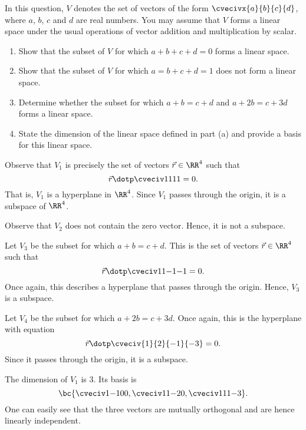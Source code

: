 \begin{problem}
    In this question, $V$ denotes the set of vectors of the form $\cvecivx{a}{b}{c}{d}$, where $a$, $b$, $c$ and $d$ are real numbers. You may assume that $V$ forms a linear space under the usual operations of vector addition and multiplication by scalar.

    \begin{enumerate}
        \item Show that the subset of $V$ for which $a + b + c + d = 0$ forms a linear space.
        \item Show that the subset of $V$ for which $a = b + c + d = 1$ does not form a linear space.
        \item Determine whether the subset for which $a + b = c + d$ and $a + 2b = c + 3d$ forms a linear space.
        \item State the dimension of the linear space defined in part (a) and provide a basis for this linear space.
    \end{enumerate}
\end{problem}
\begin{solution}
    \begin{ppart}
        Observe that $V_1$ is precisely the set of vectors $\vec r \in \RR^4$ such that \[\vec r \dotp \cveciv1111 = 0.\] That is, $V_1$ is a hyperplane in $\RR^4$. Since $V_1$ passes through the origin, it is a subspace of $\RR^4$.
    \end{ppart}
    \begin{ppart}
        Observe that $V_2$ does not contain the zero vector. Hence, it is not a subspace.
    \end{ppart}
    \begin{ppart}
        Let $V_3$ be the subset for which $a + b = c + d$. This is the set of vectors $\vec r \in \RR^4$ such that \[\vec r \dotp \cveciv11{-1}{-1} = 0.\] Once again, this describes a hyperplane that passes through the origin. Hence, $V_3$ is a subspace.

        Let $V_4$ be the subset for which $a + 2b = c + 3d$. Once again, this is the hyperplane with equation \[\vec r \dotp \cveciv{1}{2}{-1}{-3} = 0.\] Since it passes through the origin, it is a subspace.
    \end{ppart}
    \begin{ppart}
        The dimension of $V_1$ is 3. Its basis is \[\bc{\cveciv1{-1}00, \cveciv11{-2}{0}, \cveciv111{-3}}.\] One can easily see that the three vectors are mutually orthogonal and are hence linearly independent.
    \end{ppart}
\end{solution}

